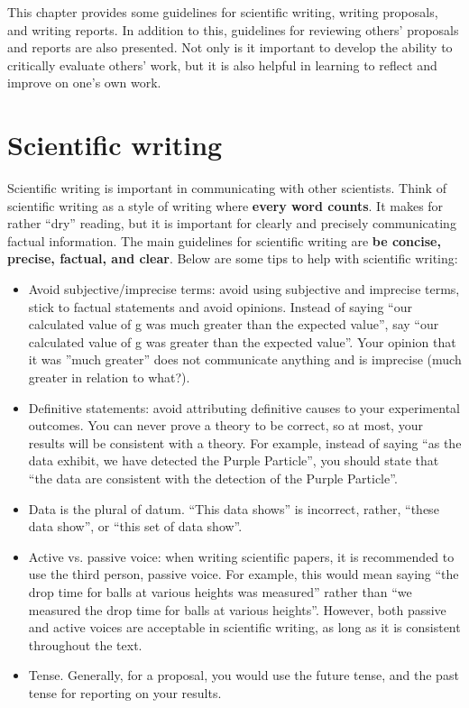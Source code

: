 This chapter provides some guidelines for scientific writing, writing proposals, and writing reports. In addition to this, guidelines for reviewing others' proposals and reports are also presented. Not only is it important to develop the ability to critically evaluate others' work, but it is also helpful in learning to reflect and improve on one's own work.

 \vspace{0.25cm}
\section{Scientific writing}
Scientific writing is important in communicating with other scientists. Think of scientific writing as a style of writing where \textbf{every word counts}. It makes for rather ``dry'' reading, but it is important for clearly and precisely communicating factual information. The main guidelines for scientific writing are \textbf{be concise, precise, factual, and clear}. Below are some tips to help with scientific writing:
\begin{itemize}
\item Avoid subjective/imprecise terms: avoid using subjective and imprecise terms, stick to factual statements and avoid opinions.  Instead of saying ``our calculated value of g was much greater than the expected value'', say ``our calculated value of g was greater than the expected value''. Your opinion that it was ''much greater'' does not communicate anything and is imprecise (much greater in relation to what?).
\item Definitive statements: avoid attributing definitive causes to your experimental outcomes. You can never prove a theory to be correct, so at most, your results will be consistent with a theory. For example, instead of saying ``as the data exhibit, we have detected the Purple Particle'', you should state that ``the data are consistent with the detection of the Purple Particle''. 
\item Data is the plural of datum. ``This data shows'' is incorrect, rather, ``these data show'', or ``this set of data show''.
\item Active vs. passive voice: when writing scientific papers, it is recommended to use the third person, passive voice. For example, this would mean saying ``the drop time for balls at various heights was measured'' rather than ``we measured the drop time for balls at various heights''. However, both passive and active voices are acceptable in scientific writing, as long as it is consistent throughout the text.
\item Tense. Generally, for a proposal, you would use the future tense, and the past tense for reporting on your results.
\end{itemize}
